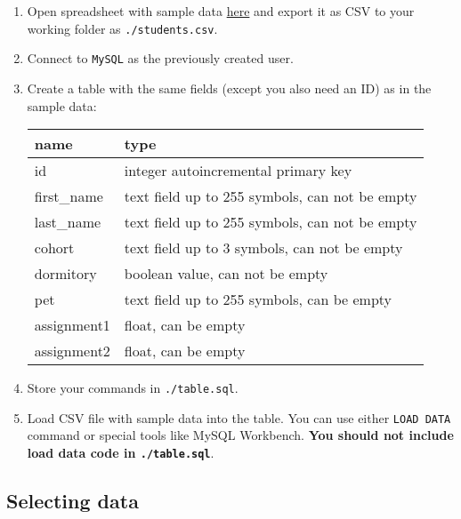\documentclass[12pt]{article}
\newcommand{\code}[1]{\texttt{#1}}
\begin{document}
\begin{enumerate}
\item Open spreadsheet with sample data \href{https://docs.google.com/spreadsheets/d/1fnpOlVMEQZJb3E07pDOHItz0ckAT2glQu6Vu9-_axvo/edit?usp=sharing}{here} and export it as CSV to your working folder as  \code{./students.csv}.
\item Connect to \code{MySQL} as the previously created user.
\item Create a table with the same fields (except you also need an ID) as in the sample data:

\begin{tabular}{| l | l | }
  \hline
  \textbf{name} & \textbf{type} \\
  \hline
  id & integer autoincremental primary key \\
  first\_name & text field up to 255 symbols, can not be empty \\
  last\_name & text field up to 255 symbols, can not be empty \\
  cohort & text field up to 3 symbols, can not be empty \\
  dormitory & boolean value, can not be empty \\
  pet  & text field up to 255 symbols, can be empty \\
  assignment1  & float, can be empty \\
  assignment2  & float, can be empty \\
  \hline
\end{tabular}

\item Store your commands in \code{./table.sql}.

\item Load CSV file with sample data into the table. You can use either \code{LOAD DATA} command or special tools like MySQL Workbench. \textbf{You should not include load data code in \code{./table.sql}}.


\end{enumerate}

\subsection*{Selecting data}
\end{document}

